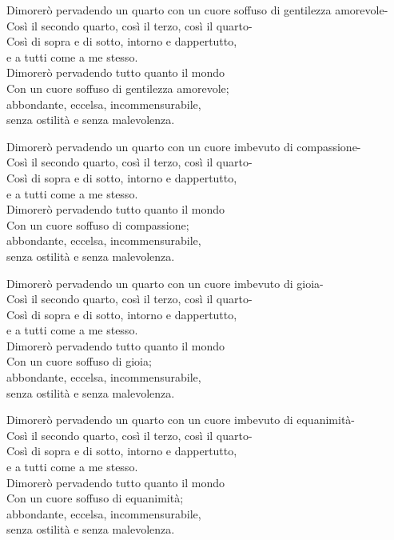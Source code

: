 Dimorerò pervadendo un quarto con un cuore soffuso di gentilezza amorevole- \\
Così il secondo quarto, così il terzo, così il quarto- \\
Così di sopra e di sotto, intorno e dappertutto, \\
e a tutti come a me stesso. \\
Dimorerò pervadendo tutto quanto il mondo \\
Con un cuore soffuso di gentilezza amorevole; \\
abbondante, eccelsa, incommensurabile, \\
senza ostilità e senza malevolenza.

Dimorerò pervadendo un quarto con un cuore imbevuto di compassione- \\
Così il secondo quarto, così il terzo, così il quarto- \\
Così di sopra e di sotto, intorno e dappertutto, \\
e a tutti come a me stesso. \\
Dimorerò pervadendo tutto quanto il mondo \\
Con un cuore soffuso di compassione; \\
abbondante, eccelsa, incommensurabile, \\
senza ostilità e senza malevolenza.

Dimorerò pervadendo un quarto con un cuore imbevuto di gioia- \\
Così il secondo quarto, così il terzo, così il quarto- \\
Così di sopra e di sotto, intorno e dappertutto, \\
e a tutti come a me stesso. \\
Dimorerò pervadendo tutto quanto il mondo \\
Con un cuore soffuso di gioia; \\
abbondante, eccelsa, incommensurabile, \\
senza ostilità e senza malevolenza.

Dimorerò pervadendo un quarto con un cuore imbevuto di equanimità- \\
Così il secondo quarto, così il terzo, così il quarto- \\
Così di sopra e di sotto, intorno e dappertutto, \\
e a tutti come a me stesso. \\
Dimorerò pervadendo tutto quanto il mondo \\
Con un cuore soffuso di equanimità; \\
abbondante, eccelsa, incommensurabile, \\
senza ostilità e senza malevolenza.


